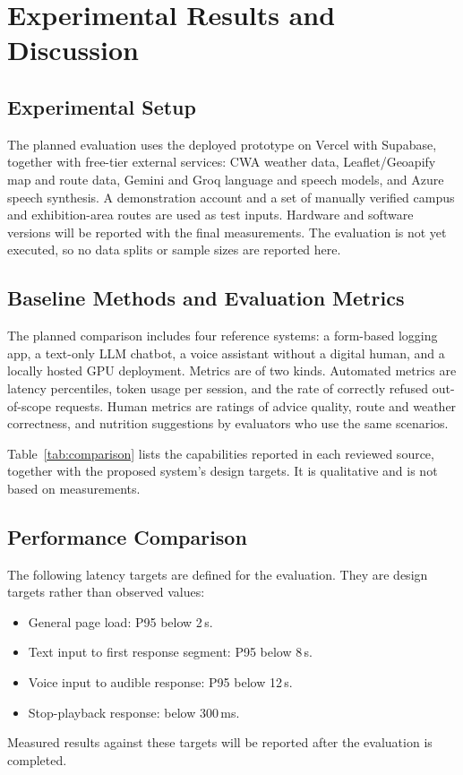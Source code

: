 \section{Experimental Results and Discussion}\label{sec:experiments}
\subsection{Experimental Setup}
The planned evaluation uses the deployed prototype on Vercel with Supabase, together with free-tier external services: CWA weather data, Leaflet/Geoapify map and route data, Gemini and Groq language and speech models, and Azure speech synthesis. A demonstration account and a set of manually verified campus and exhibition-area routes are used as test inputs. Hardware and software versions will be reported with the final measurements. The evaluation is not yet executed, so no data splits or sample sizes are reported here.

\subsection{Baseline Methods and Evaluation Metrics}
The planned comparison includes four reference systems: a form-based logging app, a text-only LLM chatbot, a voice assistant without a digital human, and a locally hosted GPU deployment. Metrics are of two kinds. Automated metrics are latency percentiles, token usage per session, and the rate of correctly refused out-of-scope requests. Human metrics are ratings of advice quality, route and weather correctness, and nutrition suggestions by evaluators who use the same scenarios.

Table~\ref{tab:comparison} lists the capabilities reported in each reviewed source, together with the proposed system's design targets. It is qualitative and is not based on measurements.

\subsection{Performance Comparison}
The following latency targets are defined for the evaluation. They are design targets rather than observed values:
\begin{itemize}
\item General page load: P95 below 2\,s.
\item Text input to first response segment: P95 below 8\,s.
\item Voice input to audible response: P95 below 12\,s.
\item Stop-playback response: below 300\,ms.
\end{itemize}
Measured results against these targets will be reported after the evaluation is completed.

